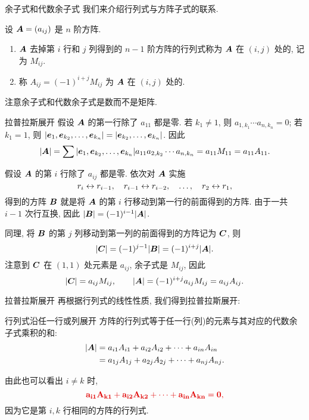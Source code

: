 \begin{frame}{余子式和代数余子式}
	\onslide<+->
	我们来介绍行列式与方阵子式的联系.
	\onslide<+->
	\begin{definition}[余子式和代数余子式]
		设 ${\boldsymbol{A}}=(a_{ij})$ 是 $n$ 阶方阵.
		\begin{enumerate}
			\item ${\boldsymbol{A}}$ 去掉第 $i$ 行和 $j$ 列得到的 $n-1$ 阶方阵的行列式称为 ${\boldsymbol{A}}$ 在 $(i,j)$ 处的\emph{}, 记为 $M_{ij}$.
			\item 称 $A_{ij}=(-1)^{i+j}M_{ij}$ 为 ${\boldsymbol{A}}$ 在 $(i,j)$ 处的\emph{}.
		\end{enumerate}
	\end{definition}
	\onslide<+->
	注意余子式和代数余子式是数而不是矩阵.
\end{frame}


\begin{frame}{拉普拉斯展开}
	\onslide<+->
	假设 ${\boldsymbol{A}}$ 的第一行除了 $a_{11}$ 都是零.
	\onslide<+->
	若 $k_1\neq 1$, 则 $a_{1,k_1}\cdots a_{n,k_n}=0$; 若 $k_1=1$, 则 $|{\boldsymbol{e}}_1,{\boldsymbol{e}}_{k_2},\dots,{\boldsymbol{e}}_{k_n}|=|{\boldsymbol{e}}_{k_2},\dots,{\boldsymbol{e}}_{k_n}|$.
	\onslide<+->
	因此
	\[|{\boldsymbol{A}}|=\sum |{\boldsymbol{e}}_1,{\boldsymbol{e}}_{k_2},\dots,{\boldsymbol{e}}_{k_n}|a_{11}a_{2,k_2}\cdots a_{n,k_n}=a_{11} M_{11}=a_{11} A_{11}.\]

	\onslide<+->
	假设 ${\boldsymbol{A}}$ 的第 $i$ 行除了 $a_{ij}$ 都是零.
	\onslide<+->
	依次对 ${\boldsymbol{A}}$ 实施
	\[r_i\leftrightarrow r_{i-1},\quad r_{i-1}\leftrightarrow r_{i-2},\quad\dots,\quad r_2\leftrightarrow r_1,\]
	得到的方阵 ${\boldsymbol{B}}$ 就是将 ${\boldsymbol{A}}$ 的第 $i$ 行移动到第一行的前面得到的方阵.
	\onslide<+->
	由于一共 $i-1$ 次行互换, 因此 $|{\boldsymbol{B}}|=(-1)^{i-1}|{\boldsymbol{A}}|$.

	\onslide<+->
	同理, 将 ${\boldsymbol{B}}$ 的第 $j$ 列移动到第一列的前面得到的方阵记为 ${\boldsymbol{C}}$, 则
	\[|{\boldsymbol{C}}|=(-1)^{j-1}|{\boldsymbol{B}}|=(-1)^{i+j}|{\boldsymbol{A}}|.\]
	\onslide<+->
	注意到 ${\boldsymbol{C}}$ 在 $(1,1)$ 处元素是 $a_{ij}$, 余子式是 $M_{ij}$,
	\onslide<+->
	因此
	\[|{\boldsymbol{C}}|=a_{ij}M_{ij},\qquad |{\boldsymbol{A}}|=(-1)^{i+j}a_{ij}M_{ij}=a_{ij}A_{ij}.\]
\end{frame}


\begin{frame}{拉普拉斯展开}
	\onslide<+->
	再根据行列式的线性性质, 我们得到拉普拉斯展开:
	\begin{second}{行列式沿任一行或列展开}
		方阵的行列式等于任一行(列)的元素与其对应的代数余子式乘积的和:
		\begin{align*}
			|{\boldsymbol{A}}|&=a_{i1}A_{i1}+a_{i2}A_{i2}+\cdots+a_{in}A_{in}\\
			&=a_{1j}A_{1j}+a_{2j}A_{2j}+\cdots+a_{nj}A_{nj}.
		\end{align*}
	\end{second}

	\onslide<+->
	由此也可以看出 \alert{$i\neq k$ 时,}
	\[\alert{a_{i1}A_{k1}+a_{i2}A_{k2}+\cdots+a_{in}A_{kn}=0,}\]
	\onslide<+->
	因为它是第 $i,k$ 行相同的方阵的行列式.
\end{frame}


